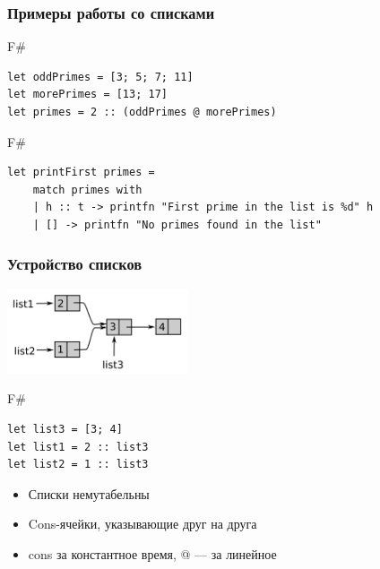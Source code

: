 \documentclass[xetex,mathserif,serif]{beamer}
\begin{document}
	\begin{frame}[fragile]
		\frametitle{Примеры работы со списками}
		\begin{exampleblock}{F\#}
			\begin{verbatim}
let oddPrimes = [3; 5; 7; 11]
let morePrimes = [13; 17]
let primes = 2 :: (oddPrimes @ morePrimes)
			\end{verbatim}
		\end{exampleblock}
		\begin{exampleblock}{F\#}
			\begin{verbatim}
let printFirst primes =
    match primes with
    | h :: t -> printfn "First prime in the list is %d" h
    | [] -> printfn "No primes found in the list"			
			\end{verbatim}
		\end{exampleblock}
\end{frame}

	\begin{frame}[fragile]
		\frametitle{Устройство списков}
		\begin{center}
			\includegraphics[width=0.4\textwidth]{lists.png}
		\end{center}
		\begin{exampleblock}{F\#}
			\begin{verbatim}
let list3 = [3; 4]
let list1 = 2 :: list3
let list2 = 1 :: list3
			\end{verbatim}
		\end{exampleblock}
		\begin{itemize}
			\item Списки немутабельны
			\item Cons-ячейки, указывающие друг на друга
			\item cons за константное время, @ --- за линейное
		\end{itemize}
\end{frame}
\end{document}
